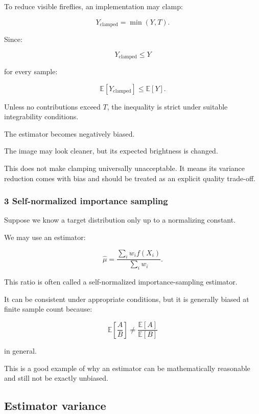 To reduce visible fireflies, an implementation may clamp:

\[
 Y_{\mathrm{clamped}}=\min(Y,T).
\]

Since:

\[
 Y_{\mathrm{clamped}}\le Y
\]

for every sample:

\[
 \mathbb E[Y_{\mathrm{clamped}}] \le \mathbb E[Y].
\]

Unless no contributions exceed \(T\), the inequality is strict under suitable integrability conditions.

The estimator becomes negatively biased.

The image may look cleaner, but its expected brightness is changed.

This does not make clamping universally unacceptable. It means its variance reduction comes with bias and should be treated as an explicit quality trade-off.

\subsubsection{3 Self-normalized importance sampling}\label{02-foundations-ii-ch030-self-normalized-importance-sampling}

\hypertarget{02-foundations-ii-ch030-self-normalized-importance-sampling}{}

Suppose we know a target distribution only up to a normalizing constant.

We may use an estimator:

\[
 \widehat\mu= \frac{ \sum_iw_i f(X_i) }{ \sum_iw_i }.
\]

This ratio is often called a self-normalized importance-sampling estimator.

It can be consistent under appropriate conditions, but it is generally biased at finite sample count because:

\[
 \mathbb E\left[\frac AB\right] \ne \frac{\mathbb E[A]}{\mathbb E[B]}
\]

in general.

This is a good example of why an estimator can be mathematically reasonable and still not be exactly unbiased.

\subsection{Estimator variance}\label{02-foundations-ii-ch030-estimator-variance}

\hypertarget{02-foundations-ii-ch030-estimator-variance}{}

